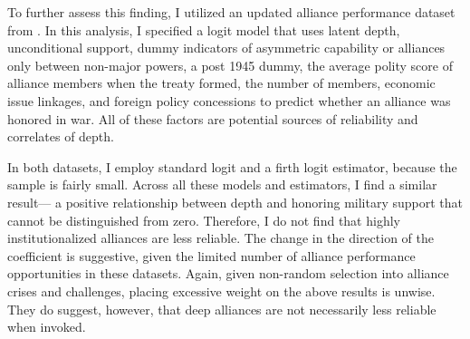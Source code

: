 \documentclass[12pt]{article}
\begin{document}
To further assess this finding, I utilized an updated alliance performance dataset from \citet{BerkemeierFuhrmann2018}.
In this analysis, I specified a logit model that uses latent depth, unconditional support, dummy indicators of asymmetric capability or alliances only between non-major powers, a post 1945 dummy, the average polity score of alliance members when the treaty formed, the number of members, economic issue linkages, and foreign policy concessions to predict whether an alliance was honored in war. 
All of these factors are potential sources of reliability and correlates of depth. 


In both datasets, I employ standard logit and a firth logit estimator, because the sample is fairly small. 
Across all these models and estimators, I find a similar result--- a positive relationship between depth and honoring military support that cannot be distinguished from zero.
Therefore, I do not find that highly institutionalized alliances are less reliable. 
The change in the direction of the coefficient is suggestive, given the limited number of alliance performance opportunities in these datasets. 
Again, given non-random selection into alliance crises and challenges, placing excessive weight on the above results is unwise. 
They do suggest, however, that deep alliances are not necessarily less reliable when invoked. 





  
 
\end{document}
